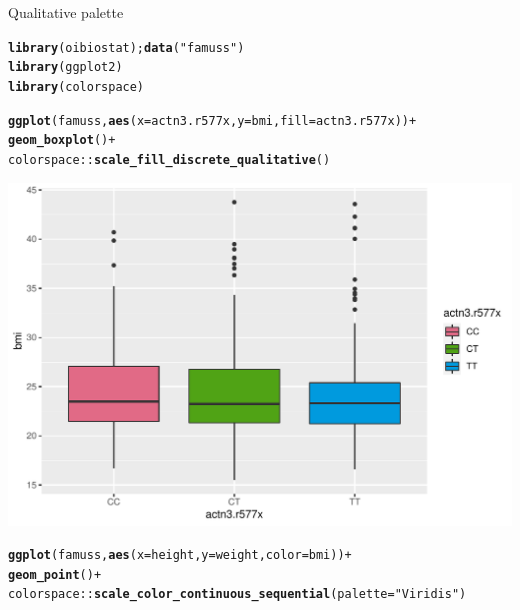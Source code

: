 \documentclass[10pt]{beamer}\usepackage[]{graphicx}\usepackage[]{color}
\makeatletter
\def\maxwidth{ %
  \ifdim\Gin@nat@width>\linewidth
    \linewidth
  \else
    \Gin@nat@width
  \fi
}
\newcommand{\hlstr}[1]{\textcolor[rgb]{0.192,0.494,0.8}{#1}}%
\newcommand{\hlopt}[1]{\textcolor[rgb]{0,0,0}{#1}}%
\newcommand{\hlstd}[1]{\textcolor[rgb]{0.345,0.345,0.345}{#1}}%
\newcommand{\hlkwc}[1]{\textcolor[rgb]{0.333,0.667,0.333}{#1}}%
\newcommand{\hlkwd}[1]{\textcolor[rgb]{0.737,0.353,0.396}{\textbf{#1}}}%
\newenvironment{kframe}{%
 \def\at@end@of@kframe{}%
 \ifinner\ifhmode%
  \def\at@end@of@kframe{\end{minipage}}%
  \begin{minipage}{\columnwidth}%
 \fi\fi%
 \def\FrameCommand##1{\hskip\@totalleftmargin \hskip-\fboxsep
 \colorbox{shadecolor}{##1}\hskip-\fboxsep
     \hskip-\linewidth \hskip-\@totalleftmargin \hskip\columnwidth}%
 \MakeFramed {\advance\hsize-\width
   \@totalleftmargin\z@ \linewidth\hsize
   \@setminipage}}%
 {\par\unskip\endMakeFramed%
 \at@end@of@kframe}
\newenvironment{knitrout}{}{} %
\makeatother
\begin{document}
\begin{frame}[fragile]{Qualitative palette}
\begin{knitrout}\tiny
{}\color{fgcolor}\begin{kframe}
\begin{alltt}
\hlkwd{library}\hlstd{(oibiostat);} \hlkwd{data}\hlstd{(}\hlstr{"famuss"}\hlstd{)}
\hlkwd{library}\hlstd{(ggplot2)}
\hlkwd{library}\hlstd{(colorspace)}

\hlkwd{ggplot}\hlstd{(famuss,} \hlkwd{aes}\hlstd{(}\hlkwc{x} \hlstd{= actn3.r577x,} \hlkwc{y} \hlstd{= bmi,} \hlkwc{fill} \hlstd{= actn3.r577x))} \hlopt{+}
  \hlkwd{geom_boxplot}\hlstd{()} \hlopt{+}
  \hlstd{colorspace}\hlopt{::}\hlkwd{scale_fill_discrete_qualitative}\hlstd{()}
\end{alltt}
\end{kframe}

{\centering \includegraphics[width=\maxwidth]{figure/unnamed-chunk-1-1} 

}


\begin{kframe}\begin{alltt}
\hlkwd{ggplot}\hlstd{(famuss,} \hlkwd{aes}\hlstd{(}\hlkwc{x} \hlstd{= height,} \hlkwc{y} \hlstd{= weight,} \hlkwc{color} \hlstd{= bmi))} \hlopt{+}
  \hlkwd{geom_point}\hlstd{()} \hlopt{+}
  \hlstd{colorspace}\hlopt{::}\hlkwd{scale_color_continuous_sequential}\hlstd{(}\hlkwc{palette} \hlstd{=} \hlstr{"Viridis"}\hlstd{)}
\end{alltt}
\end{kframe}


\end{knitrout}
\end{frame}
\end{document}
